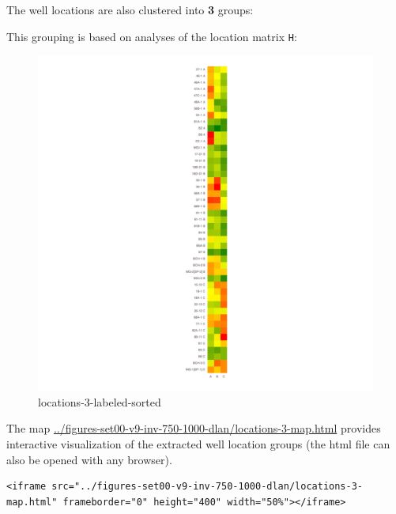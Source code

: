 \documentclass[11pt]{article}
\begin{document}
The well locations are also clustered into \textbf{3} groups:

This grouping is based on analyses of the location matrix \texttt{H}:

\begin{figure}
\centering
\includegraphics{../figures-set00-v9-inv-750-1000-dlan/locations-3-labeled-sorted.png}
\caption{locations-3-labeled-sorted}
\end{figure}

The map \url{../figures-set00-v9-inv-750-1000-dlan/locations-3-map.html}
provides interactive visualization of the extracted well location groups
(the html file can also be opened with any browser).

\begin{verbatim}
<iframe src="../figures-set00-v9-inv-750-1000-dlan/locations-3-map.html" frameborder="0" height="400" width="50%"></iframe>
\end{verbatim}


\end{document}
